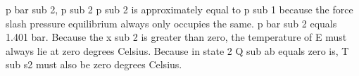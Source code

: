 p bar sub 2, p sub 2  
p sub 2 is approximately equal to p sub 1 because the force slash pressure equilibrium always only occupies the same.  
p bar sub 2 equals 1.401 bar.  
Because the x sub 2 is greater than zero, the temperature of E must always lie at zero degrees Celsius.  
Because in state 2 Q sub ab equals zero is, T sub s2 must also be zero degrees Celsius.